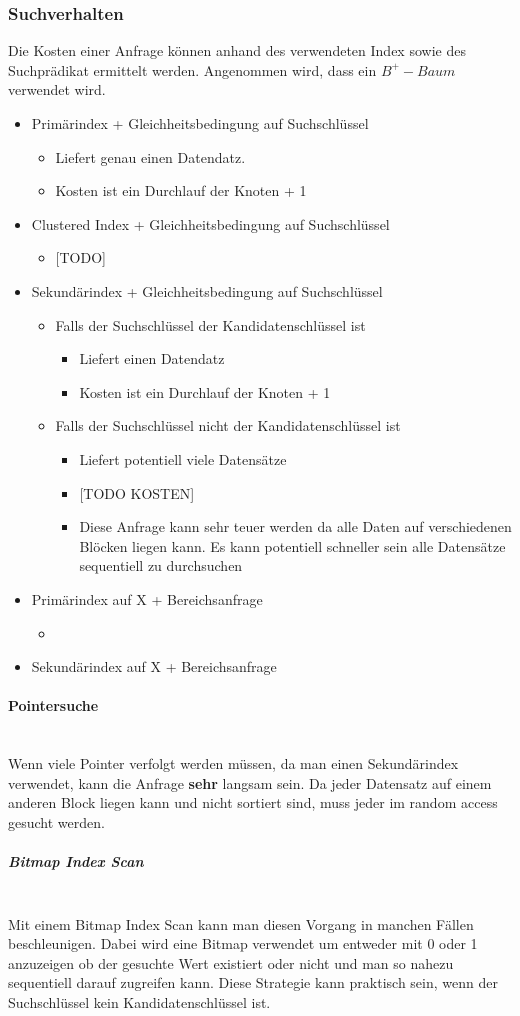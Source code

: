 \documentclass{article}
\newcommand{\paragraphlb}[1]{\paragraph{#1}\mbox{}\\}
\newcommand{\subparagraphlb}[1]{\subparagraph{#1}\mbox{}\\}
\begin{document}
	\subsubsection{Suchverhalten}
	Die Kosten einer Anfrage können anhand des verwendeten Index sowie des Suchprädikat ermittelt werden. Angenommen wird, dass ein $B^+-Baum$ verwendet wird.
	\begin{itemize}
		\item{Primärindex + Gleichheitsbedingung auf Suchschlüssel}
		\begin{itemize}
			\item{Liefert genau einen Datendatz.}
			\item{Kosten ist ein Durchlauf der Knoten + 1}
		\end{itemize}
		\item{Clustered Index + Gleichheitsbedingung auf Suchschlüssel}
		\begin{itemize}
			\item{[TODO]}
		\end{itemize}
		\item{Sekundärindex + Gleichheitsbedingung auf Suchschlüssel}
		\begin{itemize}
			\item{Falls der Suchschlüssel der Kandidatenschlüssel ist}
			\begin{itemize}
				\item{Liefert einen Datendatz}
				\item{Kosten ist ein Durchlauf der Knoten + 1}
			\end{itemize}
			\item{Falls der Suchschlüssel nicht der Kandidatenschlüssel ist}
			\begin{itemize}
				\item{Liefert potentiell viele Datensätze}
				\item{[TODO KOSTEN]}
				\item{Diese Anfrage kann sehr teuer werden da alle Daten auf verschiedenen Blöcken liegen kann. Es kann potentiell schneller sein alle Datensätze sequentiell zu durchsuchen}
			\end{itemize}
		\end{itemize}
		\item{Primärindex auf X + Bereichsanfrage}
		\begin{itemize}
			\item{}
		\end{itemize}
		\item{Sekundärindex auf X + Bereichsanfrage}
	\end{itemize}
	\paragraphlb{Pointersuche}
	Wenn viele Pointer verfolgt werden müssen, da man einen Sekundärindex verwendet, kann die Anfrage \textbf{sehr} langsam sein. Da jeder Datensatz auf einem anderen Block liegen kann und nicht sortiert sind, muss jeder im random access gesucht werden.
	\subparagraphlb{Bitmap Index Scan}
	Mit einem Bitmap Index Scan kann man diesen Vorgang in manchen Fällen beschleunigen. Dabei wird eine Bitmap verwendet um entweder mit 0 oder 1 anzuzeigen ob der gesuchte Wert existiert oder nicht und man so nahezu sequentiell darauf zugreifen kann. Diese Strategie kann praktisch sein, wenn der Suchschlüssel kein Kandidatenschlüssel ist.
\end{document}
